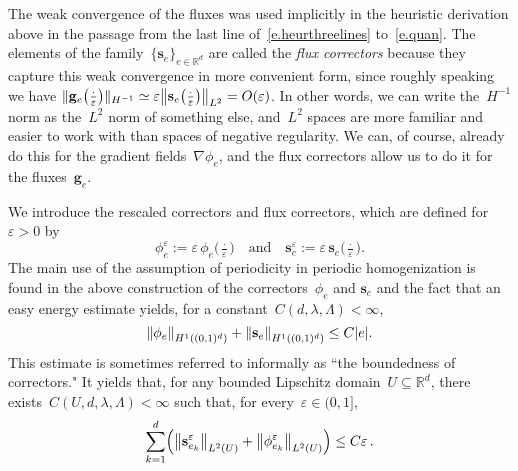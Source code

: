\documentclass[11pt]{article} %
\numberwithin{equation}{section}
\theoremstyle{definition}
\let\originalleft\left
\let\originalright\right
\renewcommand{\left}{\mathopen{}\mathclose\bgroup\originalleft}
\renewcommand{\right}{\aftergroup\egroup\originalright}
\newcommand*{\R}{\ensuremath{\mathbb{R}}}
\newcommand*{\Rd}{\ensuremath{\mathbb{R}^d}}
\newcommand{\eps}{\varepsilon}
\newcommand{\qand}{\quad \mbox{and} \quad }
\newcommand{\g}{\mathbf{g}}
\newcommand{\s}{\mathbf{s}}
\newcommand{\ep}{\eps}
\begin{document}
\smallskip

The weak convergence of the fluxes was used implicitly in the heuristic derivation above in the passage from the last line of~\eqref{e.heurthreelines} to~\eqref{e.quan}. The elements of the family~$\{ \s_e \}_{e\in\R^d}$ are called the \emph{flux correctors} because they capture this weak convergence in more convenient form, since roughly speaking we have $\| \g_e\bigl(\tfrac \cdot \ep\bigr) \|_{H^{-1}} \simeq \ep \left\| \s_e\bigl(\tfrac \cdot \ep\bigr) \right\|_{L^2} = O(\ep)$. In other words, we can write the~$H^{-1}$ norm as the~$L^2$ norm of something else, and~$L^2$ spaces are more familiar and easier to work with than spaces of negative regularity. We can, of course, already do this for the gradient fields~$\nabla \phi_e$, and the flux correctors allow us to do it for the fluxes~$\g_e$. 

\smallskip

We introduce the rescaled correctors and flux correctors, which are defined for~$\ep >0$ by
\begin{equation} \label{e.scaledcorrectors}
\phi^\ep_e  :=  \ep \, \phi_e \bigl(\tfrac \cdot\ep \bigr)
\qand
\s^\ep_e  := \ep \, \s_e \bigl(\tfrac \cdot\ep \bigr).
\end{equation}
The main use of the assumption of periodicity in periodic homogenization is found in the above construction of the correctors~$\phi_e$ and $\s_e$ and the fact that an easy energy estimate yields, for a constant~$C(d,\lambda,\Lambda)<\infty$, 
\begin{equation}
\label{e.correctorsbounded}
\left\| \phi_e \right\|_{H^1((0,1)^d)} 
+
\left\| \s_e \right\|_{H^1((0,1)^d)}
\leq 
C|e|.
\end{equation}
This estimate is sometimes referred to informally as ``the boundedness of correctors."
It yields that, for any bounded Lipschitz domain~$U\subseteq\Rd$, there exists~$C(U,d,\lambda,\Lambda)<\infty$ such that, for every~$\ep\in (0,1]$, 
\begin{equation}
\label{e.correctorsbounded2}
\sum_{k=1}^d 
\left( \left\| \s_{e_k}^\ep  \right\|_{L^2(U)} + \left\| \phi_{e_k}^\ep  \right\|_{L^2(U)}   \right)
\leq 
C \ep
\,.
\end{equation}
\end{document}
